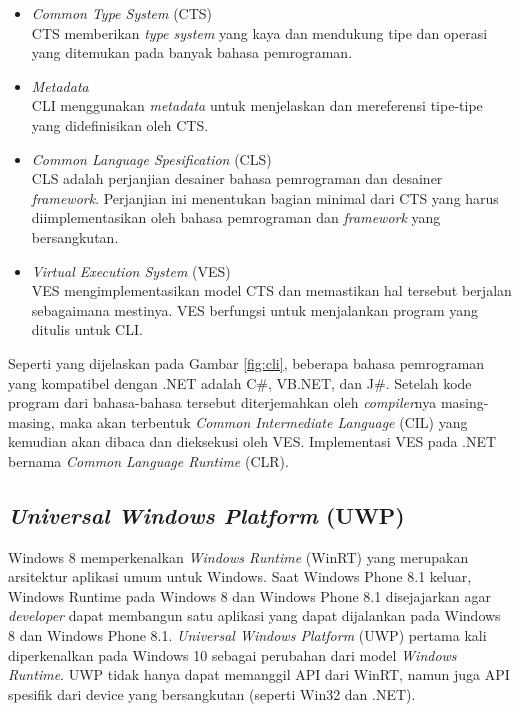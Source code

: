 \begin{itemize}
    \item{\textit{Common Type System} (CTS)\\CTS memberikan \textit{type system} yang kaya dan mendukung tipe dan operasi yang ditemukan pada banyak bahasa pemrograman.}
    \item{\textit{Metadata}\\CLI menggunakan \textit{metadata} untuk menjelaskan dan mereferensi tipe-tipe yang didefinisikan oleh CTS.}
    \item{\textit{Common Language Spesification} (CLS)\\CLS adalah perjanjian desainer bahasa pemrograman dan desainer \textit{framework}. Perjanjian ini menentukan bagian minimal dari CTS yang harus diimplementasikan oleh bahasa pemrograman dan \textit{framework} yang bersangkutan.}
    \item{\textit{Virtual Execution System} (VES)\\VES mengimplementasikan model CTS dan memastikan hal tersebut berjalan sebagaimana mestinya. VES berfungsi untuk menjalankan program yang ditulis untuk CLI.}
\end{itemize}

Seperti yang dijelaskan pada Gambar \ref{fig:cli}, beberapa bahasa pemrograman yang kompatibel dengan .NET adalah C\#, VB.NET, dan J\#\cite{NET_PRIMER:2016}. Setelah kode program dari bahasa-bahasa tersebut diterjemahkan oleh \textit{compiler}nya masing-masing, maka akan terbentuk \textit{Common Intermediate Language} (CIL) yang kemudian akan dibaca dan dieksekusi oleh VES\cite{CLI:2016}. Implementasi VES pada .NET bernama \textit{Common Language Runtime} (CLR).

\subsection{\textit{Universal Windows Platform} (UWP)}
\label{subsec:uwp}

Windows 8 memperkenalkan \textit{Windows Runtime} (WinRT) yang merupakan arsitektur aplikasi umum untuk Windows\cite{UWP:2016}. Saat Windows Phone 8.1 keluar, Windows Runtime pada Windows 8 dan Windows Phone 8.1 disejajarkan agar \textit{developer} dapat membangun satu aplikasi yang dapat dijalankan pada Windows 8 dan Windows Phone 8.1. \textit{Universal Windows Platform} (UWP) pertama kali diperkenalkan pada Windows 10 sebagai perubahan dari model \textit{Windows Runtime}. UWP tidak hanya dapat memanggil API dari WinRT, namun juga API spesifik dari device yang bersangkutan (seperti Win32 dan .NET).

